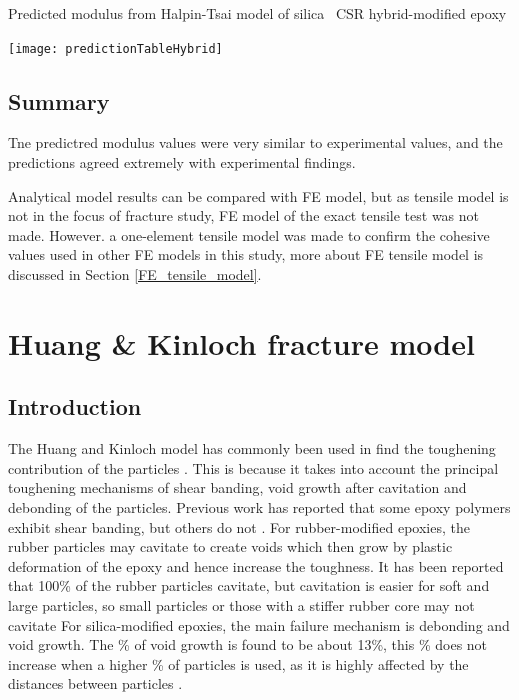 \documentclass[numbers=noendperiod,chapterprefix=on]{icldt} %
\begin{document}
\begin{table}[!htpb]
\centering
\caption{Predicted modulus from Halpin-Tsai model of silica \ CSR hybrid-modified epoxy } \label{predictionTableHybrid}
\texttt{[image: predictionTableHybrid]}
\end{table}
\FloatBarrier

\subsection{Summary}
Tne predictred modulus values were very similar to experimental values, and the predictions agreed extremely with experimental findings. 

Analytical model results can be compared with FE model, but as tensile model is not in the focus of fracture study, FE model of the exact tensile test was not made. However. a one-element tensile model was made to confirm the cohesive values used in other FE models in this study, more about FE tensile model is discussed in Section \ref{FE_tensile_model}.  

\section{Huang \& Kinloch fracture model}

\subsection{Introduction}
The Huang and Kinloch model \cite{Huang1992c} has commonly been used in find the toughening contribution of the particles \cite{Hsieh2010a,Hsieh2010,Giannakopoulos2011}. This is because it takes into account the principal toughening mechanisms of shear banding, void growth after cavitation and debonding of the particles. Previous work has reported that some epoxy polymers exhibit shear banding, but others do not \cite{Hsieh2010a,Hsieh2010,Giannakopoulos2011}. 
For rubber-modified epoxies, the rubber particles may cavitate to create voids which then grow by plastic deformation of the epoxy and hence increase the toughness. It has been reported that 100\% of the rubber particles cavitate, but cavitation is easier for soft and large particles, so small particles or those with a stiffer rubber core may not cavitate \cite{Giannakopoulos2011}
For silica-modified epoxies, the main failure mechanism is debonding and void growth. The \% of void growth is found to be about 13\%, this \% does not increase when a higher \% of particles is used, as it is highly affected by the distances between particles \cite{Hsieh2010a,Hsieh2010}. 
\end{document}
